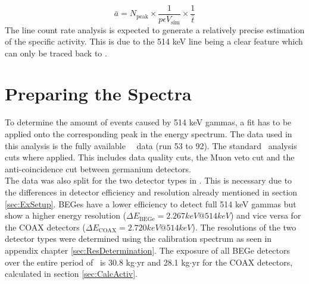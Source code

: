 \documentclass[encoding=utf8,british]{tumphthesis}
\begin{document}
\begin{equation}
    \bar{a} = N_{\mathrm{peak}} \times \frac{1}{p \epsilon V_{\mathrm{sim}}} \times \frac{1}{\bar{t}}
    \label{equ:activityDieErste}
\end{equation}
The line count rate analysis is expected to generate a relatively precise estimation of the specific activity.
This is due to the 514 keV line being a clear feature which can only be traced back to \Kr.
\\

\section{Preparing the Spectra}
\label{sec:prep}

To determine the amount of events caused by 514 keV gammas, a fit has to be applied onto the corresponding peak in the energy spectrum.
The data used in this analysis is the fully available \gerda\ \PII\ data (run 53 to 92).
The standard \gerda\ analysis cuts where applied.
This includes data quality cuts, the Muon veto cut and the anti-coincidence cut between germanium detectors.
\\

The data was also split for the two detector types in \gerda.
This is necessary due to the differences in detector efficiency and resolution already mentioned in section \ref{sec:ExSetup}.
BEGes have a lower efficiency to detect full 514 keV gammas but show a higher energy resolution ($\Delta E_{\mathrm{BEGe}} = 2.267\unit{keV}  @ 514 \unit{keV}$) and vice versa for the COAX detectors ($\Delta E_{\mathrm{COAX}} = 2.720\unit{keV} @ 514 \unit{keV}$).
The resolutions of the two detector types were determined using the calibration spectrum as seen in appendix chapter \ref{sec:ResDetermination}.
The exposure of all BEGe detectors over the entire period of \PII\ is 30.8 kg$\cdot$yr and 28.1 kg$\cdot$yr for the COAX detectors, calculated in section \ref{sec:CalcActiv}.
\\
\end{document}
